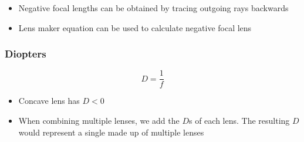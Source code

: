     \begin{itemize}
      \item Negative focal lengths can be obtained by tracing outgoing rays
      backwards
      \item Lens maker equation can be used to calculate negative focal lens
    \end{itemize}

  \subsubsection{Diopters}

    \begin{equation}
      D = \frac{1}{f}
    \end{equation}

    \begin{itemize}
      \item Concave lens has $ D < 0 $
      \item When combining multiple lenses, we add the $ D $s of each lens.
      The resulting $ D $ would represent a single  made up of multiple
      lenses
    \end{itemize}
